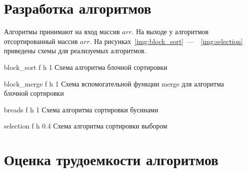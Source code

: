 \section{Разработка алгоритмов}

Алгоритмы принимают на вход массив $arr$.
На выходе у алгоритмов отсортированный массив $arr$.
На рисунках~\ref{img:block_sort}~---~~\ref{img:selection} приведены схемы для реализуемых алгоритмов.

	{block_sort} %
	{f} %
	{h} %
	{1\textwidth} %
	{Схема алгоритма блочной сортировки} %
 \clearpage

	{block_merge} %
	{f} %
	{h} %
	{1\textwidth} %
	{Схема вспомогательной функции merge для алгоритма блочной сортировки} %
\clearpage

	{breads} %
	{f} %
	{h} %
	{1\textwidth} %
	{Схема алгоритма сортировки бусинами} %
\clearpage

	{selection} %
	{f} %
	{h} %
	{0.4\textwidth} %
	{Схема алгоритма сортировки выбором} %
\clearpage



\section{Оценка трудоемкости алгоритмов}

